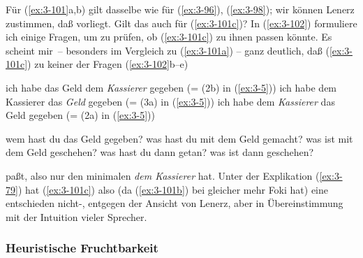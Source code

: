 \documentclass[output=paper]{langsci/langscibook}
\begin{document}
Für (\ref{ex:3-101}a,b) gilt dasselbe wie für (\ref{ex:3-96}), (\ref{ex:3-98}); wir können Lenerz
zustimmen, daß  vorliegt. Gilt das auch für (\ref{ex:3-101c})? In
(\ref{ex:3-102}) formuliere ich einige Fragen, um zu prüfen, ob (\ref{ex:3-101c}) zu ihnen
passen könnte. Es scheint mir~-- besonders im Vergleich zu (\ref{ex:3-101a}) --
ganz deutlich, daß (\ref{ex:3-101c}) zu keiner der Fragen (\ref{ex:3-102}b--e)
\begin{exe}
\ex
\label{ex:3-101}
\begin{xlist}
\ex
\label{ex:3-101a}
ich habe das Geld dem \textit{Kassierer} gegeben (= (2b) in (\ref{ex:3-5}))
\ex
\label{ex:3-101b}
ich habe dem Kassierer das \textit{Geld} gegeben (= (3a) in (\ref{ex:3-5}))
\ex
\label{ex:3-101c}
ich habe dem \textit{Kassierer} das Geld gegeben (= (2a) in (\ref{ex:3-5}))
\end{xlist}
\ex
\label{ex:3-102}
\begin{xlist}
\ex
\label{ex:3-102a}
wem hast du das Geld gegeben?
\ex
\label{ex:3-102b}
was hast du mit dem Geld gemacht?
\ex
\label{ex:3-102c}
was ist mit dem Geld geschehen?
\ex
\label{ex:3-102d}
was hast du dann getan?
\ex
\label{ex:3-102e}
was ist dann geschehen?
\end{xlist}
\end{exe}
paßt, also nur den minimalen  \textit{dem Kassierer} hat. Unter der
Explikation (\ref{ex:3-79}) hat (\ref{ex:3-101c}) also (da (\ref{ex:3-101b}) bei gleicher
 mehr Foki hat) eine entschieden nicht-,
entgegen der Ansicht von Lenerz, aber in Übereinstimmung mit der
Intuition vieler Sprecher.

\subsubsection{Heuristische Fruchtbarkeit}
\label{subsubsec:3-1-4-3}
\end{document}
